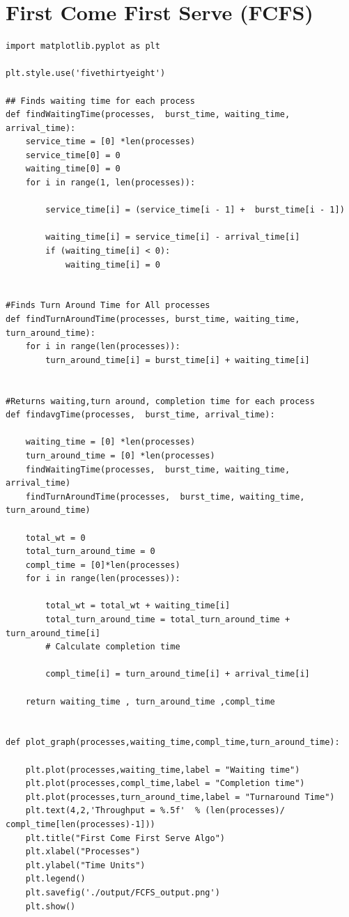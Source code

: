 \documentclass[11pt,a4paper]{report}
\begin{document}
\chapter{First Come First Serve (FCFS)}


\begin{lstlisting}[columns=fullflexible,caption=FCFS Source Code,breaklines=true,postbreak=\mbox{\textcolor{red}{$\hookrightarrow$}\space}]
import matplotlib.pyplot as plt

plt.style.use('fivethirtyeight')

## Finds waiting time for each process
def findWaitingTime(processes,  burst_time, waiting_time, arrival_time):  
    service_time = [0] *len(processes) 
    service_time[0] = 0
    waiting_time[0] = 0
    for i in range(1, len(processes)):  
           
        service_time[i] = (service_time[i - 1] +  burst_time[i - 1])  
  
        waiting_time[i] = service_time[i] - arrival_time[i]  
        if (waiting_time[i] < 0): 
            waiting_time[i] = 0
      

#Finds Turn Around Time for All processes
def findTurnAroundTime(processes, burst_time, waiting_time, turn_around_time):  
    for i in range(len(processes)): 
        turn_around_time[i] = burst_time[i] + waiting_time[i]  
  
  
#Returns waiting,turn around, completion time for each process
def findavgTime(processes,  burst_time, arrival_time):  

    waiting_time = [0] *len(processes)
    turn_around_time = [0] *len(processes) 
    findWaitingTime(processes,  burst_time, waiting_time, arrival_time)  
    findTurnAroundTime(processes,  burst_time, waiting_time, turn_around_time)  

    total_wt = 0
    total_turn_around_time = 0
    compl_time = [0]*len(processes)
    for i in range(len(processes)): 
  
        total_wt = total_wt + waiting_time[i]  
        total_turn_around_time = total_turn_around_time + turn_around_time[i]  
        # Calculate completion time

        compl_time[i] = turn_around_time[i] + arrival_time[i] 

    return waiting_time , turn_around_time ,compl_time


def plot_graph(processes,waiting_time,compl_time,turn_around_time):

    plt.plot(processes,waiting_time,label = "Waiting time")
    plt.plot(processes,compl_time,label = "Completion time")
    plt.plot(processes,turn_around_time,label = "Turnaround Time")
    plt.text(4,2,'Throughput = %.5f'  % (len(processes)/ compl_time[len(processes)-1]))
    plt.title("First Come First Serve Algo")
    plt.xlabel("Processes")
    plt.ylabel("Time Units")
    plt.legend()
    plt.savefig('./output/FCFS_output.png')
    plt.show()




\end{lstlisting}
\end{document}
